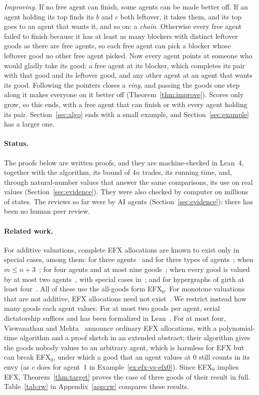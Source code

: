 \documentclass[runningheads,11pt]{llncs}
\newcommand{\efxz}{\texorpdfstring{\mbox{EFX$_0$}}{EFX0}}
\begin{document}
\emph{Improving.} If no free agent can finish, some agents can be made better off. If an agent holding its top finds its $b$ and $c$ both leftover, it takes them, and its top goes to an agent that wants it, and so on: a \emph{chain}. Otherwise every free agent failed to finish because it has at least as many blockers with distinct leftover goods as there are free agents, so each free agent can pick a blocker whose leftover good no other free agent picked. Now every agent points at someone who would gladly take its good: a free agent at its blocker, which completes its pair with that good and its leftover good, and any other agent at an agent that wants its good. Following the pointers closes a \emph{ring}, and passing the goods one step along it makes everyone on it better off (Theorem~\ref{thm:improve}). Scores only grow, so this ends, with a free agent that can finish or with every agent holding its pair. Section~\ref{sec:algo} ends with a small example, and Section~\ref{sec:example} has a larger one.

\paragraph{Status.} The proofs below are written proofs, and they are machine-checked in Lean~4, together with the algorithm, its bound of $4n$ trades, its running time, and, through natural-number values that answer the same comparisons, its use on real values (Section~\ref{sec:evidence}). They were also checked by computer on millions of states. The reviews so far were by AI agents (Section~\ref{sec:evidence}); there has been no human peer review.

\paragraph{Related work.} For additive valuations, complete EFX allocations are known to exist only in special cases, among them: for three agents~\cite{ChaudhuryGM20} and for three types of agents~\cite{HVGNV25}; when $m\le n+3$~\cite{Mahara21}; for four agents and at most nine goods~\cite{AlkassarFM26}; when every good is valued by at most two agents~\cite{AfshinmehrAMMS26}, with special cases in~\cite{ChristodoulouFKS23,SgouritsaS25,KavianiSS24}; and for hypergraphs of girth at least four~\cite{LianeasSS26}. All of these use the all-goods form \efxz{}. For monotone valuations that are not additive, EFX allocations need not exist~\cite{AkramiMMSW26,MackenzieS26}. We restrict instead how many goods each agent values. For at most two goods per agent, serial dictatorship suffices and has been formalized in Lean~\cite{MrdEfx}. For at most four, Viswanathan and Mehta~\cite{ViswanathanM24} announce ordinary EFX allocations, with a polynomial-time algorithm and a proof sketch in an extended abstract; their algorithm gives the goods nobody values to an arbitrary agent, which is harmless for EFX but can break \efxz{}, under which a good that an agent values at $0$ still counts in its envy (as $c$ does for agent~1 in Example~\ref{ex:efx-vs-efx0}). Since \efxz{} implies EFX, Theorem~\ref{thm:target} proves the case of three goods of their result in full. Table~\ref{tab:rw} in Appendix~\ref{app:rw} compares these results.
\end{document}
